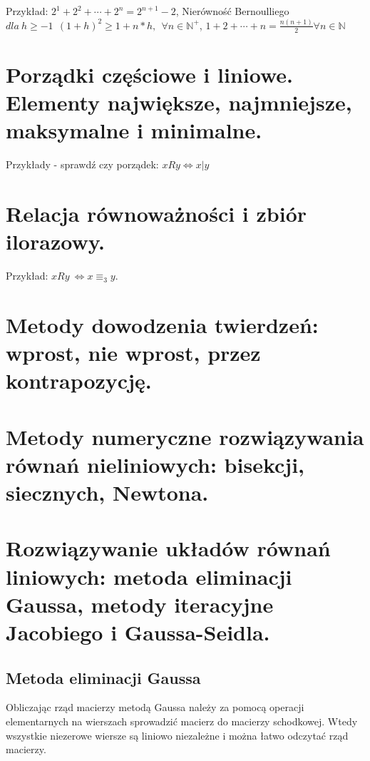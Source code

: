 \documentclass[12pt]{article}
\begin{document}
    Przykład: $2^1 + 2^2 + \cdots + 2^n = 2^{n+1} - 2$, Nierówność Bernoulliego
    $dla ~ h \geq -1 ~~ (1+h)^2 \geq 1 + n*h, ~~ \forall n \in \mathbb{N}^{+}$, $1 + 2 + \cdots + n = \frac{n(n+1)}{2} \forall n \in \mathbb{N}$

    \newpage

    \section{Porządki częściowe i liniowe. Elementy największe, najmniejsze, maksymalne i minimalne.}

    Przykłady - sprawdź czy porządek: $xRy \Leftrightarrow x | y$

    \newpage

    \section{Relacja równoważności i zbiór ilorazowy.}

    Przykład: $xRy ~ \Leftrightarrow x \equiv_3 y$.

    \newpage

    \section{Metody dowodzenia twierdzeń: wprost, nie wprost, przez kontrapozycję.}

    \newpage

    \section{Metody numeryczne rozwiązywania równań nieliniowych: bisekcji, siecznych, Newtona.}

    \newpage

    \section{Rozwiązywanie układów równań liniowych: metoda eliminacji Gaussa, metody iteracyjne Jacobiego i Gaussa-Seidla.}

    \subsection{Metoda eliminacji Gaussa}

    Obliczając rząd macierzy metodą Gaussa należy za pomocą operacji elementarnych na wierszach sprowadzić macierz do
    macierzy schodkowej. Wtedy wszystkie niezerowe wiersze są liniowo niezależne i można łatwo odczytać rząd macierzy.
\end{document}
